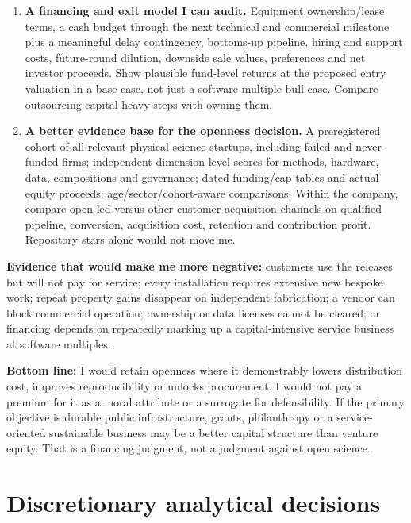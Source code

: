 \begin{enumerate}
  only where legally permitted. Do not assume an award can be
  renegotiated after taking the money.
\item
  \textbf{A financing and exit model I can audit.} Equipment
  ownership/lease terms, a cash budget through the next technical and
  commercial milestone plus a meaningful delay contingency, bottoms-up
  pipeline, hiring and support costs, future-round dilution, downside
  sale values, preferences and net investor proceeds. Show plausible
  fund-level returns at the proposed entry valuation in a base case, not
  just a software-multiple bull case. Compare outsourcing capital-heavy
  steps with owning them.
\item
  \textbf{A better evidence base for the openness decision.} A
  preregistered cohort of all relevant physical-science startups,
  including failed and never-funded firms; independent dimension-level
  scores for methods, hardware, data, compositions and governance; dated
  funding/cap tables and actual equity proceeds; age/sector/cohort-aware
  comparisons. Within the company, compare open-led versus other
  customer acquisition channels on qualified pipeline, conversion,
  acquisition cost, retention and contribution profit. Repository stars
  alone would not move me.
\end{enumerate}

\textbf{Evidence that would make me more negative:} customers use the
releases but will not pay for service; every installation requires
extensive new bespoke work; repeat property gains disappear on
independent fabrication; a vendor can block commercial operation;
ownership or data licenses cannot be cleared; or financing depends on
repeatedly marking up a capital-intensive service business at software
multiples.

\textbf{Bottom line:} I would retain openness where it demonstrably
lowers distribution cost, improves reproducibility or unlocks
procurement. I would not pay a premium for it as a moral attribute or a
surrogate for defensibility. If the primary objective is durable public
infrastructure, grants, philanthropy or a service-oriented sustainable
business may be a better capital structure than venture equity. That is
a financing judgment, not a judgment against open science.

\section{Discretionary analytical
decisions}\label{discretionary-analytical-decisions}

